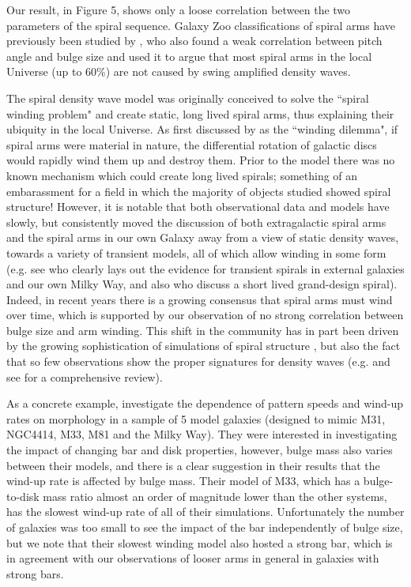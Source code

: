\documentclass[usenatbib]{mn2e}
\begin{document}
 Our result, in Figure 5, shows only a loose correlation between the two parameters of the spiral sequence. Galaxy Zoo classifications of spiral arms have previously been studied by \citet{Hart2017b,Hart2018}, who also found a weak correlation between pitch angle and bulge size and used it to argue that most spiral arms in the local Universe (up to 60\%) are not caused by swing amplified density waves.  

The spiral density wave model \citep{LinShu1964} was originally conceived to solve the ``spiral winding problem" and create static, long lived spiral arms, thus explaining their ubiquity in the local Universe. As first discussed by \citet{Oort1962} as the ``winding dilemma", if spiral arms were material in nature, the differential rotation of galactic discs would rapidly wind them up and destroy them. Prior to the \citet{LinShu1964} model there was no known mechanism which could create long lived spirals; something of an embarassment for a field in which the majority of objects studied showed spiral structure! However, it is notable that both observational data and models have slowly, but consistently moved the discussion of both extragalactic spiral arms \citep{2013ApJ...766...34D} and the spiral arms in our own Galaxy \citep{hunt2018} away from a view of static density waves, towards a variety of transient models, all of which allow winding in some form (e.g. see \citealt{Sellwood2011} who clearly lays out the evidence for transient spirals in external galaxies and our own Milky Way, and also \citealt{Merrifield2006} who discuss a short lived grand-design spiral). Indeed, in recent years there is a growing consensus that spiral arms must wind over time, which is supported by our observation of no strong correlation between bulge size and arm winding. This shift in the community has in part been driven by the growing sophistication of simulations of spiral structure \citep[e.g.][]{Grand2013,Grand2017,Forgan2018,PettittWadsley2018}, but also the fact that so few observations show the proper signatures for density waves (e.g. \citealt{Merrifield2006,hunt2018} and see \citealt{Sellwood2011} for a comprehensive review).

  As a concrete example, \citet{PettittWadsley2018} investigate the dependence of pattern speeds and wind-up rates on morphology in a sample of 5 model galaxies (designed to mimic M31, NGC4414, M33, M81 and the Milky Way). They were interested in investigating the impact of changing bar and disk properties, however, bulge mass also varies between their models, and there is a clear suggestion in their results that the wind-up rate is affected by bulge mass. Their model of M33, which has a bulge-to-disk mass ratio almost an order of magnitude lower than the other systems, has the slowest wind-up rate of all of their simulations. Unfortunately the number of galaxies was too small to see the impact of the bar independently of bulge size, but we note that their slowest winding model also hosted a strong bar, which is in agreement with our observations of looser arms in general in galaxies with strong bars.
\end{document}
